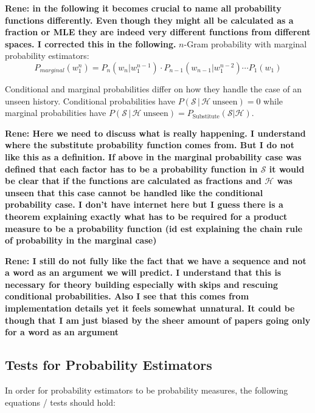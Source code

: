 \documentclass[11pt,a4paper]{article}
\newcommand{\Seq}{\mathcal{S}}
\newcommand{\Hist}{\mathcal{H}}
\newcommand{\rp}[1]{\textbf{Rene: #1}}
\begin{document}
\rp{in the following it becomes crucial to name all probability functions differently. Even though they might all be calculated as a fraction or MLE they are indeed very different functions from different spaces. I corrected this in the following.}
  $n$-Gram probability with marginal probability estimators:
  \begin{equation}
    P_{marginal}(w_1^n) = P_n(w_n | w_1^{n-1}) \cdot P_{n-1}(w_{n-1} | w_1^{n-2}) \dotsm P_1(w_1)
  \end{equation}

  Conditional and marginal probabilities differ  on how they handle the case of
  an unseen history. Conditional probabilities have
  $P(\Seq \, | \, \Hist \: \mathrm{unseen}) = 0$
  while marginal probabilities have
  $P(\Seq \, | \, \Hist \: \mathrm{unseen}) = P_\mathrm{Substitute}(\Seq | \Hist)$.

\rp{Here we need to discuss what is really happening. I understand where the substitute probability function comes from. But I do not like this as a definition. If above in the marginal probability case was defined that each factor has to be a probability function in $\Seq$ it would be clear that if the functions are calculated as fractions and $\Hist$ was unseen that this case cannot be handled like the conditional probability case. I don't have internet here but I guess there is a theorem explaining exactly what has to be required for a product measure to be a probability function (id est explaining the chain rule of probability in the marginal case)}

\rp{I still do not fully like the fact that we have a sequence and not a word as an argument we will predict. I understand that this is necessary for theory building especially with skips and rescuing conditional probabilities. Also I see that this comes from implementation details yet it feels somewhat unnatural. It could be though that I am just biased by the sheer amount of papers going only for a word as an argument}

  \subsection{Tests for Probability Estimators}

  In order for probability estimators to be probability measures, the
  following equations / tests should hold:
\end{document}
